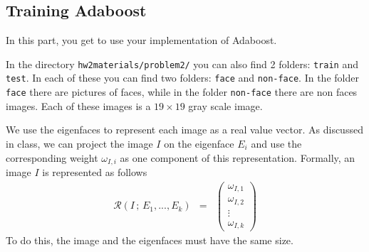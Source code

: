 \subsection{Training Adaboost}
In this part, you get to use your implementation of Adaboost.

In the directory \texttt{hw2materials/problem2/} you can also find 2 folders: \texttt{train} and \texttt{test}. In each of these
you can find two folders: \texttt{face} and \texttt{non-face}. In the folder \texttt{face} there are pictures of faces, while in the
folder \texttt{non-face} there are non faces images. Each of these images is a $19 \times 19$ gray scale image.




We use the eigenfaces to represent each image as a real value vector. As discussed in class, we can project the image $I$ on the eigenface $E_i$ and use the corresponding weight $\omega_{I,i}$ as one component of this representation. Formally, an image $I$ is represented as follows
\begin{eqnarray}
    \mathcal{R}(I \, ; \, E_1, ..., E_k) & = & \left( \begin{array}{c} \omega_{I,1} \\ \omega_{I,2} \\ \vdots \\ \omega_{I,k} \end{array} \right)
\end{eqnarray}
To do this, the image and the eigenfaces must have the same size. 
